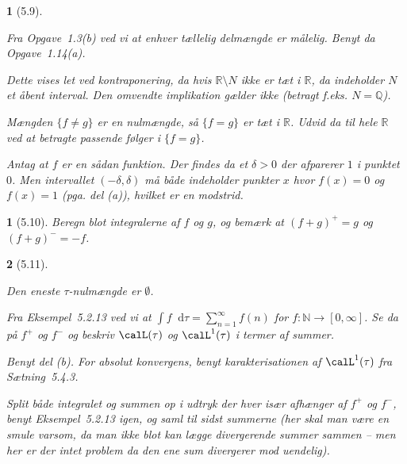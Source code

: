 \documentclass[a4paper, 11pt, article, danish, oneside]{memoir}
\title{\doctitle}
\author{\docauthor}
\newcommand{\naturals}{\mathbb{N}}
\newcommand{\rationals}{\mathbb{Q}}
\newcommand{\reals}{\mathbb{R}}
\newcommand{\dif}{\mathop{}\!\mathrm{d}}
\newcommand{\pencilsymbol}{\raisebox{-2pt}{\normalfont\PencilLeft}}
\theoremstyle{changedotcustomnumber}
\newtheorem{opgave}{\pencilsymbol}
\theoremstyle{changedotbreakcustomnumber}
\newtheorem{opgavebreak}{\pencilsymbol}
\begin{document}
\maketitle


\begin{opgavebreak}[5.9]
\begin{solutionsec}
    \item Fra Opgave~1.3(b) ved vi at enhver tællelig delmængde er målelig. Benyt da Opgave~1.14(a).

    \item Dette vises let ved kontraponering, da hvis $\reals \setminus N$ ikke er tæt i $\reals$, da indeholder $N$ et åbent interval. Den omvendte implikation gælder ikke (betragt f.eks. $N = \rationals$).

    \item Mængden $\{f \neq g\}$ er en nulmængde, så $\{f = g\}$ er tæt i $\reals$. Udvid da til hele $\reals$ ved at betragte passende følger i $\{f = g\}$.

    \item Antag at $f$ er en sådan funktion. Der findes da et $\delta > 0$ der afparerer $1$ i punktet $0$. Men intervallet $(-\delta,\delta)$ må både indeholder punkter $x$ hvor $f(x) = 0$ og $f(x) = 1$ (pga. del (a)), hvilket er en modstrid.
\end{solutionsec}
\end{opgavebreak}


\begin{opgave}[5.10]
    Beregn blot integralerne af $f$ og $g$, og bemærk at $(f + g)^+ = g$ og $(f + g)^- = -f$.
\end{opgave}


\begin{opgavebreak}[5.11]
\begin{solutionsec}
    \item Den eneste $\tau$-nulmængde er $\emptyset$.

    \item Fra Eksempel~5.2.13 ved vi at $\int f \dif\tau = \sum_{n=1}^\infty f(n)$ for $f \colon \naturals \to [0,\infty]$. Se da på $f^+$ og $f^-$ og beskriv $\calL(\tau)$ og $\calL^1(\tau)$ i termer af summer.

    \item Benyt del (b). For absolut konvergens, benyt karakterisationen af $\calL^1(\tau)$ fra Sætning~5.4.3.

    \item Split både integralet og summen op i udtryk der hver især afhænger af $f^+$ og $f^-$, benyt Eksempel~5.2.13 igen, og saml til sidst summerne (her skal man være en smule varsom, da man ikke blot kan lægge divergerende summer sammen -- men her er der intet problem da den ene sum divergerer mod \emph{uendelig}).
\end{solutionsec}
\end{opgavebreak}
\end{document}
